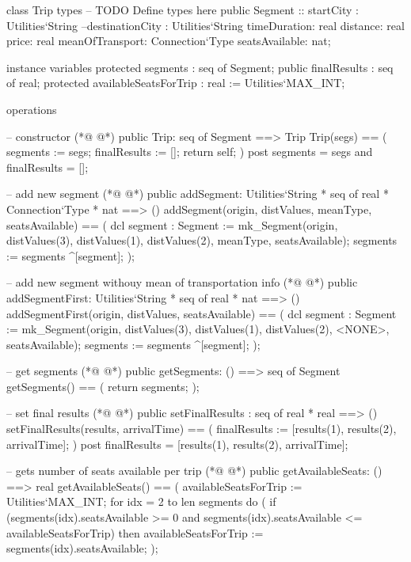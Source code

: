 \begin{vdmpp}[breaklines=true]
class Trip
types
-- TODO Define types here
 public Segment :: startCity : Utilities`String
           --destinationCity : Utilities`String
           timeDuration: real
           distance: real
           price: real
           meanOfTransport: Connection`Type
           seatsAvailable: nat;

instance variables
 protected segments : seq of Segment;
 public finalResults : seq of real;
 protected availableSeatsForTrip : real := Utilities`MAX_INT;
  
operations
 
 -- constructor
(*@
\label{Trip:20}
@*)
 public Trip: seq of Segment ==> Trip
 Trip(segs) ==
 (
  segments := segs;
  finalResults := [];
  return self;
 )
 post segments = segs and finalResults = [];
 
 -- add new segment
(*@
\label{addSegment:30}
@*)
 public addSegment: Utilities`String * seq of real * Connection`Type * nat ==> ()
 addSegment(origin, distValues, meanType, seatsAvailable) ==
 (
  dcl segment : Segment := mk_Segment(origin, distValues(3), distValues(1), distValues(2), meanType, seatsAvailable);
  segments := segments ^[segment]; 
 );
 
 -- add new segment withouy mean of transportation info
(*@
\label{addSegmentFirst:38}
@*)
 public addSegmentFirst: Utilities`String * seq of real  * nat ==> ()
 addSegmentFirst(origin, distValues, seatsAvailable) ==
 (
  dcl segment : Segment := mk_Segment(origin, distValues(3), distValues(1), distValues(2), <NONE>, seatsAvailable);
  segments := segments ^[segment]; 
 );
 
 -- get segments
(*@
\label{getSegments:46}
@*)
 public getSegments: () ==> seq of Segment
 getSegments() ==
 (
  return segments;
 );
 
 -- set final results
(*@
\label{setFinalResults:53}
@*)
 public setFinalResults : seq of real * real ==> ()
 setFinalResults(results, arrivalTime) ==
 (
  finalResults := [results(1), results(2), arrivalTime];
 )
 post finalResults = [results(1), results(2), arrivalTime];
 
 -- gets number of seats available per trip
(*@
\label{getAvailableSeats:61}
@*)
 public getAvailableSeats: () ==> real
 getAvailableSeats() ==
 (
   availableSeatsForTrip := Utilities`MAX_INT;
  for idx = 2 to len segments do (
   if (segments(idx).seatsAvailable >= 0 and segments(idx).seatsAvailable <= availableSeatsForTrip) then
    availableSeatsForTrip := segments(idx).seatsAvailable;
  );
   

\end{vdmpp}
